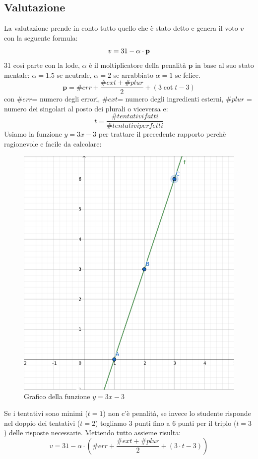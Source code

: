 \subsection{Valutazione}
La valutazione prende in conto tutto quello che è stato detto e genera il voto $v$ con la seguente formula:
\[
v = 31 - \alpha \cdot \textbf{p} \\
\]
31 così parte con la lode, $\alpha$ è il moltiplicatore della penalità $\textbf{p}$ in base al suo stato mentale: $\alpha = 1.5$ se neutrale, $\alpha=2$ se arrabbiato $\alpha = 1$ se felice.
\[
\textbf{p} = \#err + \frac{\#ext + \#plur}{2} + (3\cot t - 3)
\]
con $\#err$= numero degli errori, $\#ext$= numero degli ingredienti esterni, $\#plur$ = numero dei singolari al posto dei plurali o viceversa e:
\[
t = \frac{\#tentativi fatti}{\# tentativi perfetti}
\]
\newpage
Usiamo la funzione $y = 3x -3$ per trattare il precedente rapporto perchè ragionevole e facile da calcolare:
\begin{figure}[h]
\centerline{\includegraphics[scale=0.25]{Images/3x-3.png}}
\caption{Grafico della funzione $y = 3x -3$}
\label{fig:FunzioneVoto}
\end{figure}

Se i tentativi sono minimi ($t=1$) non c'è penalità, se invece lo studente risponde nel doppio dei tentativi ($t=2$) togliamo 3 punti fino a 6 punti per il triplo ($t=3$) delle risposte necessarie.
\newline
Mettendo tutto assieme risulta:
\[
v = 31 - \alpha \cdot (\#err + \frac{\#ext + \#plur}{2} + (3\cdot t - 3))
\]
